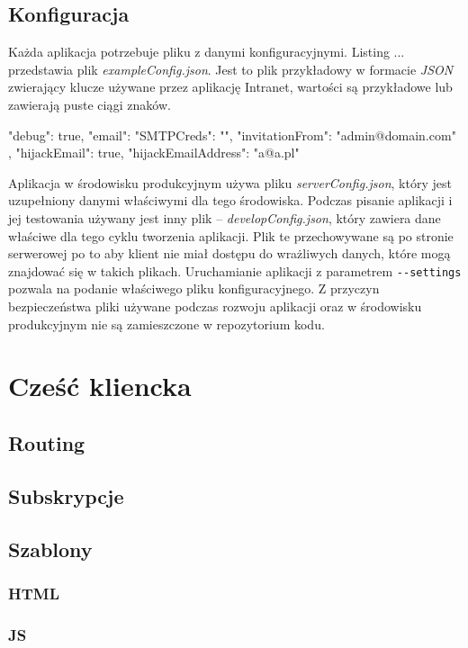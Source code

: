   \subsection{Konfiguracja}
Każda aplikacja potrzebuje pliku z danymi konfiguracyjnymi. Listing ... przedstawia plik \textit{exampleConfig.json}. Jest to plik przykładowy w formacie \textit{JSON} zwierający klucze używane przez aplikację Intranet, wartości są przykładowe lub zawierają puste ciągi znaków.
\begin{js}[caption={{Przykładowa konfiguracja - \textit{exampleConfig.json}}},label={lst:config}]
{
  "debug": true,
  "email": {
    "SMTPCreds": "",
    "invitationFrom": "admin@domain.com"
  },
  "hijackEmail": true,
  "hijackEmailAddress": "a@a.pl"
}
\end{js}
Aplikacja w środowisku produkcyjnym używa pliku \textit{serverConfig.json}, który jest uzupełniony danymi właściwymi dla tego środowiska. Podczas pisanie aplikacji i jej testowania używany jest inny plik -- \textit{developConfig.json}, który zawiera dane właściwe dla tego cyklu tworzenia aplikacji. Plik te przechowywane są po stronie serwerowej po to aby klient nie miał dostępu do wrażliwych danych, które mogą znajdować się w takich plikach. Uruchamianie aplikacji z parametrem \verb|--settings| pozwala na podanie właściwego pliku konfiguracyjnego. Z przyczyn bezpieczeństwa pliki używane podczas rozwoju aplikacji oraz w środowisku produkcyjnym nie są zamieszczone w repozytorium kodu.

\section{Cześć kliencka}
  \subsection{Routing}
  \subsection{Subskrypcje}
  \subsection{Szablony}
    \subsubsection{HTML}
    \subsubsection{JS}
